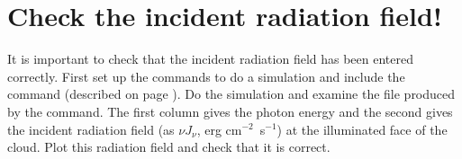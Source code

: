 \section{Check the incident radiation field!}

It is important to check that the incident radiation field
has been entered correctly.
First set up the commands to do a simulation and include the  command
(described on page \pageref{sec:CommandSaveContinuum}).
Do the simulation and examine the
file produced by the  command.
The first column gives the
photon energy and the second gives the incident radiation field
(as $\nu J_{\nu}$, erg cm$^{-2}$~s$^{-1}$)
at the illuminated face of the cloud.
Plot this radiation field and check that it is correct.

